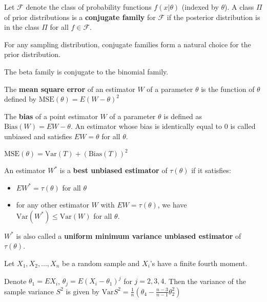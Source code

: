 \begin{defn}
    Let $\mathcal{F}$ denote the class of probability functions $f(x|\theta)$ (indexed by $\theta$). A class $\Pi$ of prior distributions is a \textbf{conjugate family} for $\mathcal{F}$ if the posterior distribution is in the class $\Pi$ for all $f \in \mathcal{F}$.
\end{defn}

\begin{note}
    For any sampling distribution, conjugate families form a natural choice for the prior distribution.
\end{note}

\begin{note}
    The beta family is conjugate to the binomial family.
\end{note}

\begin{defn}
    The \textbf{mean square error} of an estimator $W$ of a parameter $\theta$ is the function of $\theta$ defined by $\text{MSE}(\theta) = E(W - \theta)^2$
\end{defn}

\begin{defn}
    The \textbf{bias} of a point estimator $W$ of a parameter $\theta$ is defined as $\text{Bias}(W) = EW - \theta$. 
    An estimator whose bias is identically equal to $0$ is called unbiased and satisfies $EW = \theta$ for all $\theta$.
\end{defn}

\begin{note}
    $\text{MSE}(\theta) = \text{Var}(T) + (\text{Bias}(T))^2$
\end{note}

\begin{defn}
    An estimator $W^*$ is a \textbf{best unbiased estimator} of $\tau(\theta)$ if it satisfies:
    \begin{itemize}
        \item $EW^* = \tau(\theta)$ for all $\theta$
        \item for any other estimator $W$ with $EW = \tau(\theta)$, we have $\text{Var}(W^*) \leq \text{Var}(W)$ for all $\theta$.
    \end{itemize}
            $W^*$ is also called a \textbf{uniform minimum variance unbiased estimator} of $\tau(\theta)$.
\end{defn}

\begin{thm}
    Let $X_1, X_2, ..., X_n$ be a random sample and $X_i$'s have a finite fourth moment.

    Denote $\theta_1 = EX_i$, $\theta_j = E(X_i - \theta_1)^j$ for $j = 2, 3, 4$.
    Then the variance of the sample variance $S^2$ is given by $\text{Var}S^2 = \frac{1}{n} \left ( \theta_4 - \frac{n - 3}{n-1} \theta_2^2 \right )$
\end{thm}

